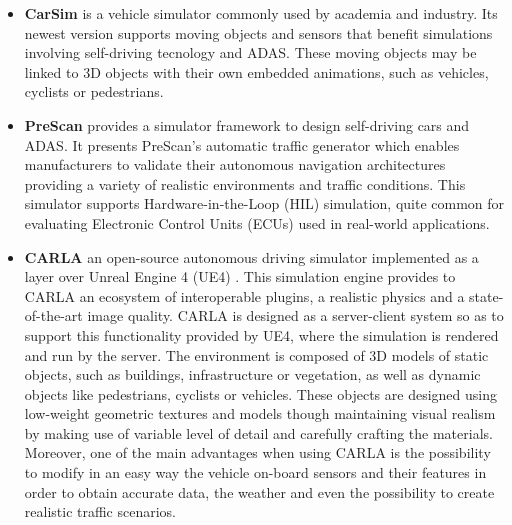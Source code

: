 \begin{itemize}
	
	
	\item \textbf{CarSim} \cite{benekohal1988carsim} is a vehicle simulator commonly used by academia and industry. Its newest version supports moving objects and sensors that benefit simulations involving self-driving tecnology and ADAS. These moving objects may be linked to 3D objects with their own embedded animations, such as vehicles, cyclists or pedestrians.
	
	\item \textbf{PreScan} \cite{tideman2013simulation} provides a simulator framework to design self-driving cars and \ac{ADAS}. It presents PreScan's automatic traffic generator which enables manufacturers to validate their autonomous navigation architectures providing a variety of realistic environments and traffic conditions. This simulator supports Hardware-in-the-Loop (HIL) simulation, quite common for evaluating Electronic Control Units (ECUs) used in real-world applications.
	
	\item \textbf{\ac{CARLA}} \cite{dosovitskiy2017carla} an open-source autonomous driving simulator implemented as a layer over Unreal Engine 4 (UE4) \cite{sanders2016introduction}. This simulation engine provides to \ac{CARLA} an ecosystem of interoperable plugins, a realistic physics and a state-of-the-art image quality. \ac{CARLA} is designed as a server-client system so as to support this functionality provided by UE4, where the simulation is rendered and run by the server. The environment is composed of 3D models of static objects, such as buildings, infrastructure or vegetation, as well as dynamic objects like pedestrians, cyclists or vehicles. These objects are designed using low-weight geometric textures and models though maintaining visual realism by making use of variable level of detail and carefully crafting the materials. Moreover, one of the main advantages when using \ac{CARLA} is the possibility to modify in an easy way the vehicle on-board sensors and their features in order to obtain accurate data, the weather and even the possibility to create realistic traffic scenarios.
	

\end{itemize}
